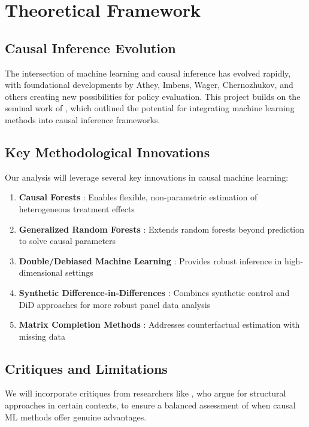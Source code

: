 \documentclass[12pt,a4paper]{article}
\begin{document}
\section{Theoretical Framework}

\subsection{Causal Inference Evolution}
The intersection of machine learning and causal inference has evolved rapidly, with foundational developments by Athey, Imbens, Wager, Chernozhukov, and others creating new possibilities for policy evaluation. This project builds on the seminal work of \citet{athey2017state}, which outlined the potential for integrating machine learning methods into causal inference frameworks.

\subsection{Key Methodological Innovations}
Our analysis will leverage several key innovations in causal machine learning:

\begin{enumerate}
    \item \textbf{Causal Forests} \citep{athey2018estimation}: Enables flexible, non-parametric estimation of heterogeneous treatment effects
    \item \textbf{Generalized Random Forests} \citep{athey2019generalized}: Extends random forests beyond prediction to solve causal parameters
    \item \textbf{Double/Debiased Machine Learning} \citep{chernozhukov2018double}: Provides robust inference in high-dimensional settings
    \item \textbf{Synthetic Difference-in-Differences} \citep{arkhangelsky2021synthetic}: Combines synthetic control and DiD approaches for more robust panel data analysis
    \item \textbf{Matrix Completion Methods} \citep{athey2021matrix}: Addresses counterfactual estimation with missing data
\end{enumerate}

\subsection{Critiques and Limitations}
We will incorporate critiques from researchers like \citet{heckman2022causality}, who argue for structural approaches in certain contexts, to ensure a balanced assessment of when causal ML methods offer genuine advantages.
\end{document}
